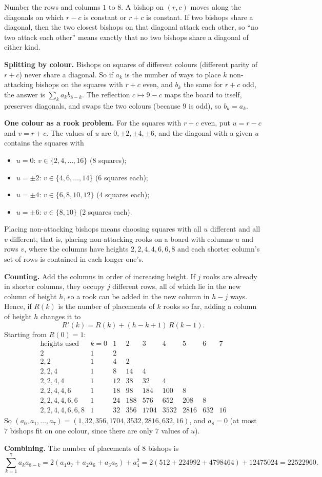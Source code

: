 Number the rows and columns $1$ to $8$. A bishop on $(r,c)$ moves along the diagonals on which $r-c$ is constant or $r+c$ is constant. If two bishops share a diagonal, then the two closest bishops on that diagonal attack each other, so ``no two attack each other'' means exactly that no two bishops share a diagonal of either kind.

\textbf{Splitting by colour.} Bishops on squares of different colours (different parity of $r+c$) never share a diagonal. So if $a_k$ is the number of ways to place $k$ non-attacking bishops on the squares with $r+c$ even, and $b_k$ the same for $r+c$ odd, the answer is $\sum_k a_kb_{8-k}$. The reflection $c\mapsto9-c$ maps the board to itself, preserves diagonals, and swaps the two colours (because $9$ is odd), so $b_k=a_k$.

\textbf{One colour as a rook problem.} For the squares with $r+c$ even, put $u=r-c$ and $v=r+c$. The values of $u$ are $0,\pm2,\pm4,\pm6$, and the diagonal with a given $u$ contains the squares with
\begin{itemize}
\item $u=0$: $v\in\{2,4,\dots,16\}$ ($8$ squares);
\item $u=\pm2$: $v\in\{4,6,\dots,14\}$ ($6$ squares each);
\item $u=\pm4$: $v\in\{6,8,10,12\}$ ($4$ squares each);
\item $u=\pm6$: $v\in\{8,10\}$ ($2$ squares each).
\end{itemize}
Placing non-attacking bishops means choosing squares with all $u$ different and all $v$ different, that is, placing non-attacking rooks on a board with columns $u$ and rows $v$, where the columns have heights $2,2,4,4,6,6,8$ and each shorter column's set of rows is contained in each longer one's.

\textbf{Counting.} Add the columns in order of increasing height. If $j$ rooks are already in shorter columns, they occupy $j$ different rows, all of which lie in the new column of height $h$, so a rook can be added in the new column in $h-j$ ways. Hence, if $R(k)$ is the number of placements of $k$ rooks so far, adding a column of height $h$ changes it to
\[R'(k)=R(k)+(h-k+1)\,R(k-1).\]
Starting from $R(0)=1$:
\[\begin{array}{c|rrrrrrrr}
\text{heights used}&k=0&1&2&3&4&5&6&7\\ \hline
2&1&2&&&&&&\\
2,2&1&4&2&&&&&\\
2,2,4&1&8&14&4&&&&\\
2,2,4,4&1&12&38&32&4&&&\\
2,2,4,4,6&1&18&98&184&100&8&&\\
2,2,4,4,6,6&1&24&188&576&652&208&8&\\
2,2,4,4,6,6,8&1&32&356&1704&3532&2816&632&16
\end{array}\]
So $(a_0,a_1,\dots,a_7)=(1,32,356,1704,3532,2816,632,16)$, and $a_8=0$ (at most $7$ bishops fit on one colour, since there are only $7$ values of $u$).

\textbf{Combining.} The number of placements of $8$ bishops is
\[\sum_{k=1}^{7}a_ka_{8-k}=2\left(a_1a_7+a_2a_6+a_3a_5\right)+a_4^2=2\left(512+224992+4798464\right)+12475024=\boxed{22522960}.\]
